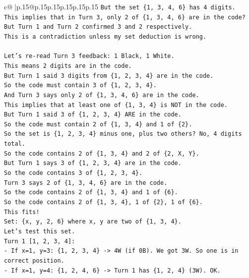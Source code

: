\documentclass{article}
\begin{document}
{\begin{supertabular}{c@{$\;$}|p{.15\linewidth}@{}p{.15\linewidth}p{.15\linewidth}p{.15\linewidth}p{.15\linewidth}p{.15\linewidth}}
{{{\texttt{But the set \{1, 3, 4, 6\} has 4 digits.} \\
\texttt{This implies that in Turn 3, only 2 of \{1, 3, 4, 6\} are in the code?} \\
\texttt{But Turn 1 and Turn 2 confirmed 3 and 2 respectively.} \\
\texttt{This is a contradiction unless my set deduction is wrong.} \\
\\ 
\texttt{Let's re{-}read Turn 3 feedback: 1 Black, 1 White.} \\
\texttt{This means 2 digits are in the code.} \\
\texttt{But Turn 1 said 3 digits from \{1, 2, 3, 4\} are in the code.} \\
\texttt{So the code must contain 3 of \{1, 2, 3, 4\}.} \\
\texttt{And Turn 3 says only 2 of \{1, 3, 4, 6\} are in the code.} \\
\texttt{This implies that at least one of \{1, 3, 4\} is NOT in the code.} \\
\texttt{But Turn 1 said 3 of \{1, 2, 3, 4\} ARE in the code.} \\
\texttt{So the code must contain 2 of \{1, 3, 4\} and 1 of \{2\}.} \\
\texttt{So the set is \{1, 2, 3, 4\} minus one, plus two others? No, 4 digits total.} \\
\texttt{So the code contains 2 of \{1, 3, 4\} and 2 of \{2, X, Y\}.} \\
\texttt{But Turn 1 says 3 of \{1, 2, 3, 4\} are in the code.} \\
\texttt{So the code contains 3 of \{1, 2, 3, 4\}.} \\
\texttt{Turn 3 says 2 of \{1, 3, 4, 6\} are in the code.} \\
\texttt{So the code contains 2 of \{1, 3, 4\} and 1 of \{6\}.} \\
\texttt{So the code contains 2 of \{1, 3, 4\}, 1 of \{2\}, 1 of \{6\}.} \\
\texttt{This fits!} \\
\texttt{Set: \{x, y, 2, 6\} where x, y are two of \{1, 3, 4\}.} \\
\texttt{Let's test this set.} \\
\texttt{Turn 1 {[}1, 2, 3, 4{]}:} \\
\texttt{{-} If x=1, y=3: \{1, 2, 3, 4\} {-}> 4W (if 0B). We got 3W. So one is in correct position.} \\
\texttt{{-} If x=1, y=4: \{1, 2, 4, 6\} {-}> Turn 1 has \{1, 2, 4\} (3W). OK.} \\
}}}
\end{supertabular}}
\end{document}
